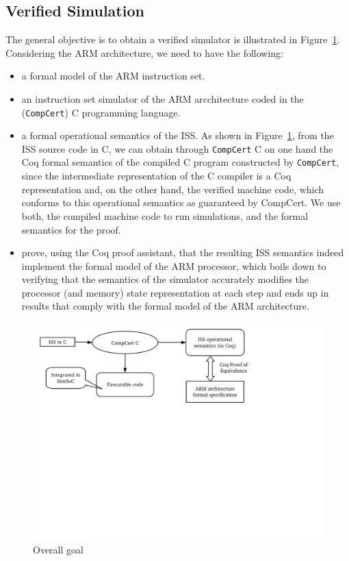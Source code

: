 \documentclass{llncs}
\newcommand{\compcert}{\texttt{CompCert}\xspace}
\begin{document}
\subsection{Verified Simulation}
\label{method}
The general objective is to obtain a verified simulator is illustrated in
Figure~\ref{fig:diagram}.  Considering the ARM architecture, we need
to have the following:\begin{itemize}\itemsep=0pt
\item a formal model of the ARM instruction set.
\item an instruction set simulator of the ARM arcchitecture coded in
  the (\compcert) C programming language.
\item a formal operational semantics of the ISS. As shown in
  Figure~\ref{fig:diagram}, from the ISS source code in C, we can
  obtain through \compcert C on one hand
  the Coq formal semantics of the compiled C program constructed by
  \compcert, since the intermediate representation of the C compiler
  is a Coq representation
  and, on the other hand,
  the verified machine code,
  which conforms to this operational semantics as guaranteed by CompCert.
  We use both, the compiled machine code to
  run simulations, and the formal semantics for the proof.
\item prove, using the Coq proof assistant, that the resulting ISS semantics
  indeed implement the formal model of the ARM processor, which boils
  down to verifying that the semantics of the simulator accurately
  modifies the processor (and memory) state representation at each
  step and ends up in results that comply with the
  formal model of the ARM architecture.
\end{itemize}
\begin{figure}
\hfil\includegraphics[width=0.9\linewidth, trim= 7mm 133mm 55mm 6mm, clip=true]
{fig/newdiag.pdf}
\caption{Overall goal}
\label{fig:diagram}
\end{figure}
\end{document}
